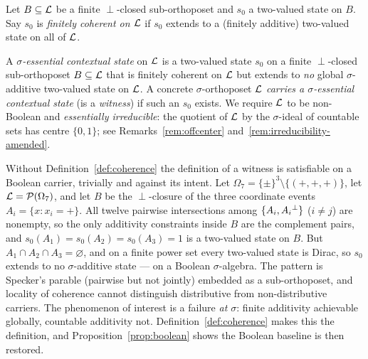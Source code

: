 \begin{definition}\label{def:coherence}
Let $B\subseteq\mathcal{L}$ be a finite $\perp$-closed sub-orthoposet and $s_0$ a two-valued
state on $B$. Say $s_0$ is \emph{finitely coherent on $\mathcal{L}$} if $s_0$ extends to a
(finitely additive) two-valued state on all of $\mathcal{L}$.
\end{definition}

\begin{definition}\label{def:sigma-essential}
A \emph{$\sigma$-essential contextual state} on $\mathcal{L}$ is a two-valued state $s_0$
on a finite $\perp$-closed sub-orthoposet $B \subseteq \mathcal{L}$ that is finitely
coherent on $\mathcal{L}$ but extends to \emph{no} global $\sigma$-additive two-valued
state on $\mathcal{L}$. A concrete $\sigma$-orthoposet $\mathcal{L}$ \emph{carries a
$\sigma$-essential contextual state} (is a \emph{witness}) if such an $s_0$
exists. We require $\mathcal{L}$ to be non-Boolean and \emph{essentially irreducible}:
the quotient of $\mathcal{L}$ by the $\sigma$-ideal of countable sets has centre
$\{0,1\}$; see Remarks~\ref{rem:offcenter} and~\ref{rem:irreducibility-amended}.
\end{definition}

\begin{remark}\label{rem:amendment}
Without Definition~\ref{def:coherence} the definition of a witness is satisfiable
on a Boolean carrier, trivially and against its intent. Let
$\Omega_7 = \{\pm\}^3\setminus\{(+,+,+)\}$, let $\mathcal{L}=\mathcal{P}(\Omega_7)$, and let $B$ be
the $\perp$-closure of the three coordinate events $A_i=\{x : x_i = +\}$. All twelve
pairwise intersections among $\{A_i, A_i{}^{\perp}\}$ ($i\neq j$) are nonempty, so the only
additivity constraints inside $B$ are the complement pairs, and $s_0(A_1)=s_0(A_2)=s_0(A_3)=1$
is a two-valued state on $B$. But $A_1\cap A_2\cap A_3=\varnothing$, and on a finite
power set every two-valued state is Dirac, so $s_0$ extends to no $\sigma$-additive
state --- on a Boolean $\sigma$-algebra. The pattern is Specker's parable
(pairwise but not jointly) embedded as a sub-orthoposet, and locality of
coherence cannot distinguish distributive from non-distributive carriers.
The phenomenon of interest is a failure \emph{at $\sigma$}: finite additivity
achievable globally, countable additivity not. Definition~\ref{def:coherence}
makes this the definition, and Proposition~\ref{prop:boolean} shows the Boolean
baseline is then restored.
\end{remark}

